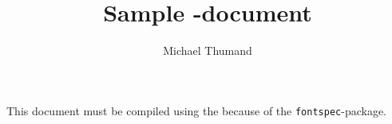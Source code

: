 \documentclass{article}
\title{Sample \XeLaTeX -document}
\author{Michael Thumand}
\begin{document}
\maketitle

This document must be compiled using the {\XeLaTeX} because of the \texttt{fontspec}-package.
\end{document}
